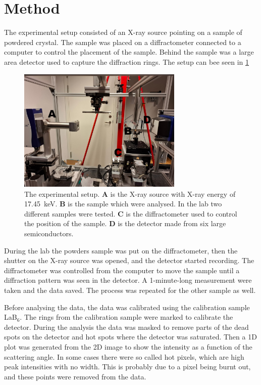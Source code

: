 \newpage
\section{Method}
The experimental setup consisted of an X-ray source pointing on a sample of powdered crystal. The sample was placed on a diffractometer connected to a computer to control the placement of the sample. Behind the sample was a large area detector used to capture the diffraction rings. The setup can bee seen in \ref{fig:setup}
\begin{figure}[H]
    \centering
    \includegraphics[width=0.7\textwidth]{Figures/setup_letters.jpg}
    \caption{The experimental setup. \textbf{A} is the X-ray source with X-ray energy of \SI{17.45}{\kilo\electronvolt}. \textbf{B} is the sample which were analysed. In the lab two different samples were tested. \textbf{C} is the diffractometer used to control the position of the sample. \textbf{D} is the detector made from six large semiconductors.}
    \label{fig:setup}
\end{figure}

During the lab the powders sample was put on the diffractometer, then the shutter on the X-ray source was opened, and the detector started recording. The diffractometer was controlled from the computer to move the sample until a diffraction pattern was seen in the detector. A 1-minute-long measurement were taken and the data saved. The process was repeated for the other sample as well.

Before analysing the data, the data was calibrated using the calibration sample LaB$_6$. The rings from the calibration sample were marked to calibrate the detector. During the analysis the data was masked to remove parts of the dead spots on the detector and hot spots where the detector was saturated. Then a 1D plot was generated from the 2D image to show the intensity as a function of the scattering angle. In some cases there were so called hot pixels, which are high peak intensities with no width. This is probably due to a pixel being burnt out, and these points were removed from the data.